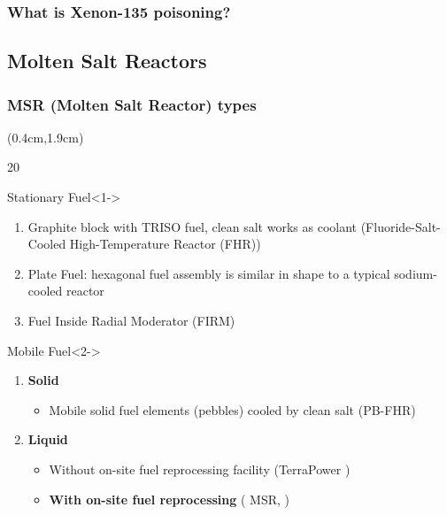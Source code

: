 \begin{frame}
\frametitle{What is Xenon-135 poisoning? \cite{noauthor_nuclear_nodate-1}}
\end{frame}

\subsection{Molten Salt Reactors}


\begin{frame}
\frametitle{MSR (Molten Salt Reactor) types}
\begin{textblock*}{12cm}(0.4cm,1.9cm) %
\begin{overlayarea}{\linewidth}{20\baselineskip}
\begin{block}{Stationary Fuel}<1->
	\begin{enumerate}
				\item Graphite block with TRISO fuel, clean salt works as 
				coolant (Fluoride-Salt-Cooled High-Temperature Reactor (FHR))
				\item Plate Fuel: hexagonal fuel assembly is similar in shape 
				to a typical sodium-cooled reactor
				\item Fuel Inside Radial Moderator (FIRM)
	\end{enumerate}
\end{block}

\begin{block}{Mobile Fuel}<2->
	\begin{enumerate}
		\item \textbf{Solid}
			\begin{itemize}
				\item<2-> Mobile solid fuel elements (pebbles) cooled by 
				clean salt (PB-FHR)
			\end{itemize}
			\item<3-> \textbf{Liquid}
			\begin{itemize}
				\item<3-> Without on-site fuel reprocessing facility 
				(TerraPower )
				\item<4-> \textbf{With on-site fuel reprocessing} 
				( MSR, )
			\end{itemize}
	\end{enumerate}
\end{block}
\end{overlayarea}
\end{textblock*}
\end{frame}



